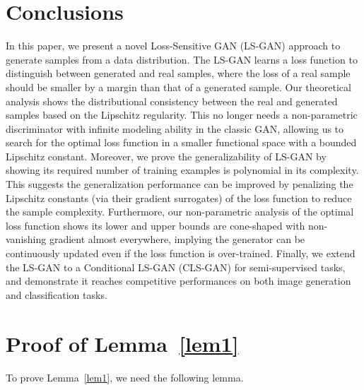 \documentclass[11pt,fullpage, letterpaper,twoside]{article}
\newcommand{\1}[1]{\mathds{1}_{\left[#1\right]}}
\begin{document}
\section{Conclusions}\label{sec:concl}
In this paper, we present a novel Loss-Sensitive GAN (LS-GAN) approach to generate samples from a data distribution.  The LS-GAN learns a loss function to distinguish between generated and real samples, where the loss of a real sample should be smaller by a margin than that of a generated sample.
Our theoretical analysis shows the distributional consistency between the real and generated samples based on the Lipschitz regularity.
This no longer needs a non-parametric discriminator with infinite modeling ability in the classic GAN, allowing us to search for the optimal loss function in a smaller functional space with a bounded Lipschitz constant.
Moreover, we prove the generalizability of LS-GAN by showing its required number of training examples is polynomial in its complexity. This suggests the generalization performance can be improved by penalizing the Lipschitz constants (via their gradient surrogates) of the loss function to reduce the sample complexity.
Furthermore, our non-parametric analysis of the optimal loss function shows its lower and upper bounds are cone-shaped with non-vanishing gradient almost everywhere, implying the generator can be continuously updated even if the loss function is over-trained.
Finally, we extend the LS-GAN to a Conditional LS-GAN (CLS-GAN) for semi-supervised tasks, and demonstrate it reaches competitive performances on both image generation and classification tasks.





         



\appendix

\section{Proof of Lemma~\ref{lem1}}\label{proof_a}
To prove Lemma~\ref{lem1}, we need the following lemma.
\end{document}
